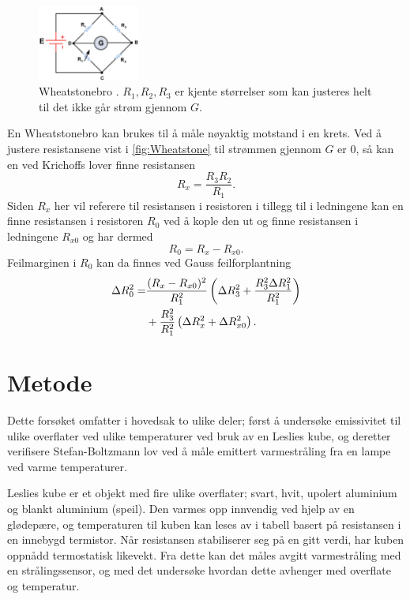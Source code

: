 \begin{figure}
  \centering
  \includegraphics[width=0.30\textwidth]{wheat.jpg}
  \caption{Wheatstonebro \cite{wheatstone}. $R_{1}, R_{2}, R_{3}$ er kjente størrelser som kan justeres helt til det ikke går strøm gjennom $G$.}
  \label{fig:Wheatstone}
\end{figure}

En Wheatstonebro kan brukes til å måle nøyaktig motstand i en krets. Ved å justere resistansene vist i \autoref{fig:Wheatstone} til strømmen gjennom $G$ er 0, så kan en ved Krichoffs lover finne resistansen
\begin{equation}
  \label{eq:Wheatstone}
  R_{x} = \frac{R_{3} R_{2}}{R_{1}}.
\end{equation}
Siden $R_{x}$ her vil referere til resistansen i resistoren i tillegg til i ledningene kan en finne resistansen i resistoren $R_{0}$ ved å kople den ut og finne resistansen i ledningene $R_{x0}$ og har dermed
\begin{equation}
  \label{eq:WheatstoneReal}
  R_{0} = R_{x} - R_{x0}.
\end{equation}
Feilmarginen i $R_{0}$ kan da finnes ved Gauss feilforplantning
\begin{align}
  \label{eq:ErrorBridge}
  \Delta R_{0}^{2} =& \frac{(R_{x} - R_{x0})^{2}}{R_{1}^{2}} \left( \Delta R_{3}^{2} + \frac{R_{3}^{2} \Delta R_{1}^{2}}{R_{1}^{2}} \right) \notag \\
  &+ \frac{R_{3}^{2}}{R_{1}^{2}} \left( \Delta R_{x}^{2} + \Delta R_{x0}^{2} \right).
\end{align}


\section{Metode}
Dette forsøket omfatter i hovedsak to ulike deler; først å undersøke emissivitet til ulike overflater ved ulike temperaturer ved bruk av en Leslies kube, og deretter verifisere Stefan-Boltzmann lov ved å måle emittert varmestråling fra en lampe ved varme temperaturer.

Leslies kube er et objekt med fire ulike overflater; svart, hvit, upolert aluminium og blankt aluminium (speil). Den varmes opp innvendig ved hjelp av en glødepære, og temperaturen til kuben kan leses av i tabell basert på resistansen i en innebygd termistor. Når resistansen stabiliserer seg på en gitt verdi, har kuben oppnådd termostatisk likevekt. Fra dette kan det måles avgitt varmestråling med en strålingssensor, og med det undersøke hvordan dette avhenger med overflate og temperatur.

